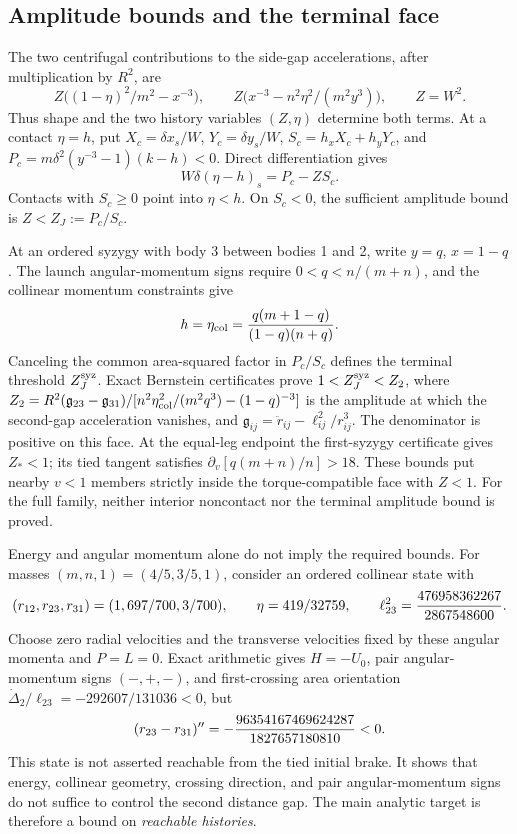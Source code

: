 \subsection{Amplitude bounds and the terminal face}

The two centrifugal contributions to the side-gap accelerations, after
multiplication by $R^2$, are
\[
 Z\bigl((1-\eta)^2/m^2-x^{-3}\bigr),\qquad
 Z\bigl(x^{-3}-n^2\eta^2/(m^2y^3)\bigr),\qquad Z=W^2.
\]
Thus shape and the two history variables $(Z,\eta)$ determine both terms.
At a contact $\eta=h$, put $X_c=\delta x_s/W$,
$Y_c=\delta y_s/W$,
$S_c=h_xX_c+h_yY_c$, and
$P_c=m\delta^2(y^{-3}-1)(k-h)<0$. Direct differentiation gives
\[
 W\delta(\eta-h)_s=P_c-ZS_c.
\]
Contacts with $S_c\ge0$ point into $\eta<h$. On $S_c<0$, the
sufficient amplitude bound is $Z<Z_J:=P_c/S_c$.

At an ordered syzygy with body 3 between bodies 1 and 2, write
$y=q$, $x=1-q$. The launch angular-momentum signs require
$0<q<n/(m+n)$, and the collinear momentum constraints give
\[
 h=\eta_{\rm col}={q(m+1-q)\over(1-q)(n+q)}.
\]
Canceling the common area-squared factor in $P_c/S_c$ defines the
terminal threshold $Z_J^{\rm syz}$. Exact Bernstein certificates prove
$1<Z_J^{\rm syz}<Z_2$, where
$Z_2=R^2(\mathfrak g_{23}-\mathfrak g_{31})/
[n^2\eta_{\rm col}^2/(m^2q^3)-(1-q)^{-3}]$ is the amplitude at which
the second-gap acceleration vanishes, and
$\mathfrak g_{ij}=\ddot r_{ij}-\ell_{ij}^2/r_{ij}^3$.
The denominator is positive on this face. At the equal-leg endpoint the
first-syzygy certificate gives $Z_*<1$; its tied tangent satisfies
$\partial_v[q(m+n)/n]>18$. These bounds put nearby $v<1$ members
strictly inside the torque-compatible face with $Z<1$.
For the full family, neither interior noncontact nor the terminal
amplitude bound is proved.

Energy and angular momentum alone do not imply the required bounds.
For masses $(m,n,1)=(4/5,3/5,1)$, consider an ordered collinear state with
\[
 (r_{12},r_{23},r_{31})=(1,697/700,3/700),\qquad
 \eta=419/32759,\qquad
 \ell_{23}^2={476958362267\over2867548600}.
\]
Choose zero radial velocities and the transverse velocities fixed by these
angular momenta and $P=L=0$. Exact arithmetic gives $H=-U_0$, pair angular-momentum
signs $(-,+,-)$, and first-crossing area orientation
$\dot\Delta_2/\ell_{23}=-292607/131036<0$, but
\[
 (r_{23}-r_{31})''=-{96354167469624287\over1827657180810}<0.
\]
This state is not asserted reachable from the tied initial brake. It shows
that energy, collinear geometry, crossing direction, and pair angular-momentum signs do
not suffice to control the second distance gap. The main analytic target
is therefore a bound on \emph{reachable histories}.
